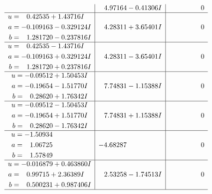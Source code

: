 \documentclass[1p]{elsarticle_modified}
\theoremstyle{definition}
\begin{document}
$$\begin{array}{c|c|c}
 & \phantom{-}4.97164 - 0.41306 I & \phantom{-0.000000 } 0 \\ \hline\begin{aligned}
u &= \phantom{-}0.42535 + 1.43716 I \\
a &= -0.109163 - 0.329124 I \\
b &= \phantom{-}1.281720 - 0.237816 I\end{aligned}
 & \phantom{-}4.28311 + 3.65401 I & \phantom{-0.000000 } 0 \\ \hline\begin{aligned}
u &= \phantom{-}0.42535 - 1.43716 I \\
a &= -0.109163 + 0.329124 I \\
b &= \phantom{-}1.281720 + 0.237816 I\end{aligned}
 & \phantom{-}4.28311 - 3.65401 I & \phantom{-0.000000 } 0 \\ \hline\begin{aligned}
u &= -0.09512 + 1.50453 I \\
a &= -0.19654 - 1.51770 I \\
b &= \phantom{-}0.28620 + 1.76342 I\end{aligned}
 & \phantom{-}7.74831 - 1.15388 I & \phantom{-0.000000 } 0 \\ \hline\begin{aligned}
u &= -0.09512 - 1.50453 I \\
a &= -0.19654 + 1.51770 I \\
b &= \phantom{-}0.28620 - 1.76342 I\end{aligned}
 & \phantom{-}7.74831 + 1.15388 I & \phantom{-0.000000 } 0 \\ \hline\begin{aligned}
u &= -1.50934\phantom{ +0.000000I} \\
a &= \phantom{-}1.06725\phantom{ +0.000000I} \\
b &= \phantom{-}1.57849\phantom{ +0.000000I}\end{aligned}
 & -4.68287\phantom{ +0.000000I} & \phantom{-0.000000 } 0 \\ \hline\begin{aligned}
u &= -0.016879 + 0.463860 I \\
a &= \phantom{-}0.99715 + 2.36389 I \\
b &= \phantom{-}0.500231 + 0.987406 I\end{aligned}
 & \phantom{-}2.53258 - 1.74513 I & \phantom{-0.000000 } 0\\
 \hline 
 \end{array}$$\newpage$$\begin{array}{c|c|c}  

\end{array}$$
\end{document}
